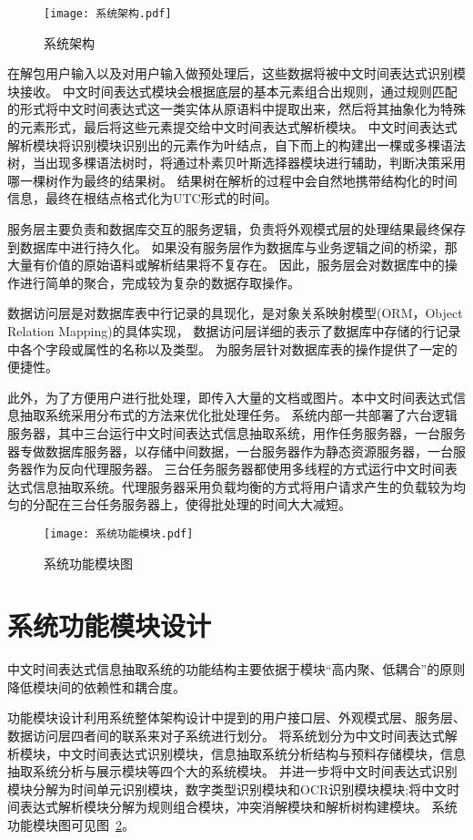 \begin{figure}[h]
  \centering
  \texttt{[image: 系统架构.pdf]}
  \caption{系统架构}
  \label{fig:architect}
\end{figure}

在解包用户输入以及对用户输入做预处理后，这些数据将被中文时间表达式识别模块接收。
中文时间表达式模块会根据底层的基本元素组合出规则，通过规则匹配的形式将中文时间表达式这一类实体从原语料中提取出来，然后将其抽象化为特殊的元素形式，最后将这些元素提交给中文时间表达式解析模块。
中文时间表达式解析模块将识别模块识别出的元素作为叶结点，自下而上的构建出一棵或多棵语法树，当出现多棵语法树时，将通过朴素贝叶斯选择器模块进行辅助，判断决策采用哪一棵树作为最终的结果树。
结果树在解析的过程中会自然地携带结构化的时间信息，最终在根结点格式化为UTC形式的时间。

服务层主要负责和数据库交互的服务逻辑，负责将外观模式层的处理结果最终保存到数据库中进行持久化。
如果没有服务层作为数据库与业务逻辑之间的桥梁，那大量有价值的原始语料或解析结果将不复存在。
因此，服务层会对数据库中的操作进行简单的聚合，完成较为复杂的数据存取操作。

数据访问层是对数据库表中行记录的具现化，是对象关系映射模型(ORM，Object Relation Mapping)的具体实现，
数据访问层详细的表示了数据库中存储的行记录中各个字段或属性的名称以及类型。
为服务层针对数据库表的操作提供了一定的便捷性。

此外，为了方便用户进行批处理，即传入大量的文档或图片。本中文时间表达式信息抽取系统采用分布式的方法来优化批处理任务。
系统内部一共部署了六台逻辑服务器，其中三台运行中文时间表达式信息抽取系统，用作任务服务器，一台服务器专做数据库服务器，以存储中间数据，一台服务器作为静态资源服务器，一台服务器作为反向代理服务器。
三台任务服务器都使用多线程的方式运行中文时间表达式信息抽取系统。代理服务器采用负载均衡的方式将用户请求产生的负载较为均匀的分配在三台任务服务器上，使得批处理的时间大大减短。

\begin{figure}[b]
  \centering
  \texttt{[image: 系统功能模块.pdf]}
  \caption{系统功能模块图}
  \label{fig:system_feature}
\end{figure}

\section{系统功能模块设计}

中文时间表达式信息抽取系统的功能结构主要依据于模块“高内聚、低耦合”的原则降低模块间的依赖性和耦合度。

功能模块设计利用系统整体架构设计中提到的用户接口层、外观模式层、服务层、数据访问层四者间的联系来对子系统进行划分。
将系统划分为中文时间表达式解析模块，中文时间表达式识别模块，信息抽取系统分析结构与预料存储模块，信息抽取系统分析与展示模块等四个大的系统模块。
并进一步将中文时间表达式识别模块分解为时间单元识别模块，数字类型识别模块和OCR识别模块模块;将中文时间表达式解析模块分解为规则组合模块，冲突消解模块和解析树构建模块。
系统功能模块图可见图~\ref{fig:system_feature}。

